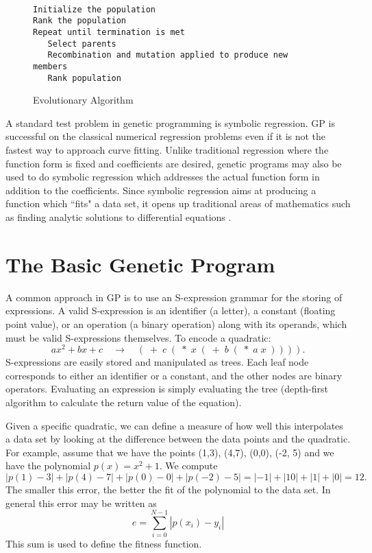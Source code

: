 \documentclass[12pt]{article}
\begin{document}
\begin{figure}[tbh]
{\color{blue}
\begin{verbatim}

Initialize the population
Rank the population
Repeat until termination is met
   Select parents
   Recombination and mutation applied to produce new members
   Rank population
\end{verbatim}
}
\caption{Evolutionary Algorithm\label{evoalg}}
\end{figure}


A standard test problem in genetic programming is symbolic regression.
GP is successful on the classical numerical regression problems even
if it is not the fastest way to approach curve fitting.  Unlike
traditional regression where the function form is fixed and
coefficients are desired, genetic programs may also be used to do
symbolic regression which addresses the actual function form in
addition to the coefficients.  Since symbolic regression aims at
producing a function which ``fits" a data set, it opens up traditional
areas of mathematics such as finding analytic solutions to
differential equations \cite{burgess:1999:faasdeGP, koza:book}.


\section{ The Basic Genetic Program}

A common approach in GP is to use an S-expression grammar for the
storing of expressions.  A valid S-expression is an identifier (a
letter), a constant (floating point value), or an operation (a binary
operation) along with its operands, which must be valid S-expressions
themselves.  To encode a quadratic:
$$ax^2 + bx + c \quad\to\quad 
(\; +\; c\; (\;*\; x\; (\;+\; b\; (\;*\; a\; x\;)))).$$ 
S-expressions
are easily stored and manipulated as trees.  Each leaf node
corresponds to either an identifier or a constant, and the other nodes
are binary operators.  Evaluating an expression is simply evaluating
the tree (depth-first algorithm to calculate the return value of the
equation).

Given a specific quadratic, we can define a measure of how well this
interpolates a data set by looking at the difference between the data
points and the quadratic.  For example, assume that we have the points
(1,3), (4,7), (0,0), (-2, 5) and we have the polynomial $p(x) = x^2
+1$.  We compute
$$|p(1) -3| + |p(4)-7| + |p(0)-0| + |p(-2)-5| = |-1| + |10| + |1| +
|0|=12.$$ The smaller this error, the better the fit of the polynomial
to the data set.  In general this error may be written as
$$e = \sum_{i=0}^{N-1}\left| p(x_i)-y_i\right|$$
This sum is used to
define the fitness function.
\end{document}

